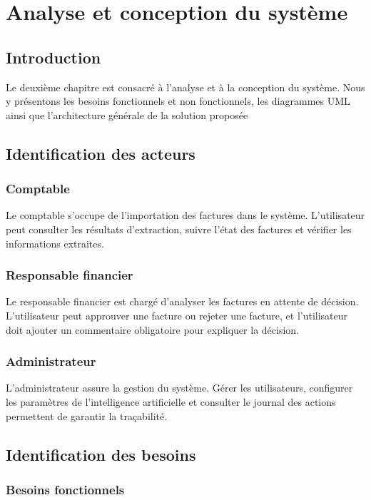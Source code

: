 \chapter{Analyse et conception du système}
\newpage
\section{Introduction}

Le deuxième chapitre est consacré à l’analyse et à la conception du système. Nous y présentons les besoins fonctionnels et non fonctionnels, les diagrammes UML ainsi que l’architecture générale de la solution proposée

\section{Identification des acteurs}

\subsection{Comptable} 
Le comptable s’occupe de l’importation des factures dans le système. 
L'utilisateur peut consulter les résultats d’extraction, suivre l’état des factures et vérifier les informations extraites.

\subsection{Responsable financier}

Le responsable financier est chargé d’analyser les factures en attente de décision. 
L'utilisateur peut approuver une facture ou rejeter une facture, et l'utilisateur doit ajouter un commentaire obligatoire pour expliquer la décision.

\subsection{Administrateur}

L’administrateur assure la gestion du système. 
Gérer les utilisateurs, configurer les paramètres de l’intelligence artificielle et consulter le journal des actions permettent de garantir la traçabilité.

\section{Identification des besoins}

\subsection{Besoins fonctionnels}

